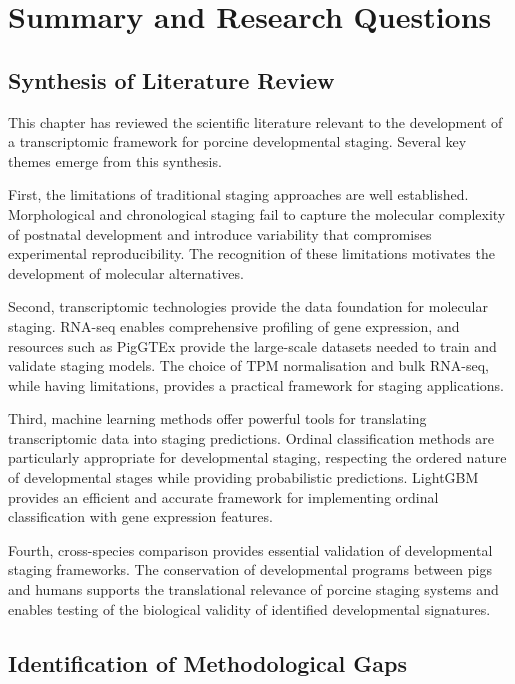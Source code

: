 \section{Summary and Research Questions}\label{sec:lit:summary}

\subsection{Synthesis of Literature Review}

This chapter has reviewed the scientific literature relevant to the development of a transcriptomic framework for porcine developmental staging. Several key themes emerge from this synthesis.

First, the limitations of traditional staging approaches are well established. Morphological and chronological staging fail to capture the molecular complexity of postnatal development and introduce variability that compromises experimental reproducibility. The recognition of these limitations motivates the development of molecular alternatives.

Second, transcriptomic technologies provide the data foundation for molecular staging. RNA-seq enables comprehensive profiling of gene expression, and resources such as PigGTEx provide the large-scale datasets needed to train and validate staging models. The choice of TPM normalisation and bulk RNA-seq, while having limitations, provides a practical framework for staging applications.

Third, machine learning methods offer powerful tools for translating transcriptomic data into staging predictions. Ordinal classification methods are particularly appropriate for developmental staging, respecting the ordered nature of developmental stages while providing probabilistic predictions. LightGBM provides an efficient and accurate framework for implementing ordinal classification with gene expression features.

Fourth, cross-species comparison provides essential validation of developmental staging frameworks. The conservation of developmental programs between pigs and humans supports the translational relevance of porcine staging systems and enables testing of the biological validity of identified developmental signatures.

\subsection{Identification of Methodological Gaps}


